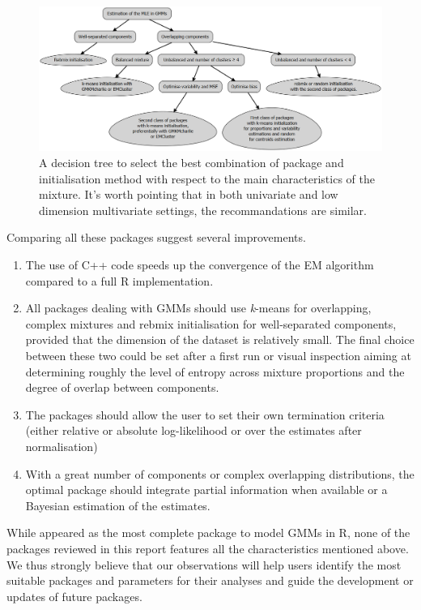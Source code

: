 \begin{figure}

{\centering \includegraphics[width=1\linewidth]{./figs/decision_tree_GMMs} 

}

\caption{A decision tree to select the best combination of package and initialisation method with respect to the main characteristics of the mixture. It's worth pointing that in both univariate and low dimension multivariate settings, the recommandations are similar.}\label{fig:decision-tree-GMMs}
\end{figure}

Comparing all these packages suggest several improvements.

\begin{enumerate}
\def\labelenumi{\arabic{enumi}.}
\item
  The use of C++ code speeds up the convergence of the EM algorithm
  compared to a full R implementation.
\item
  All packages dealing with GMMs should use \emph{k}-means for overlapping, complex mixtures and rebmix initialisation for well-separated components, provided that the dimension of the dataset is relatively small. The final choice between these two could be set after a first run or visual inspection aiming at determining roughly the level of entropy across mixture proportions and the degree of overlap between components.
\item
  The packages should allow the user to set their own termination criteria (either relative or absolute log-likelihood or over the estimates after normalisation)
\item
  With a great number of components or complex overlapping distributions, the optimal package should integrate partial information when available or a Bayesian estimation of the
  estimates.
\end{enumerate}

While  appeared as the most complete package to model GMMs in R, none of the packages reviewed in this report features all the characteristics mentioned above.
We thus strongly believe that our observations will help users identify the most suitable packages and parameters for their analyses and guide the development or updates of future packages.

